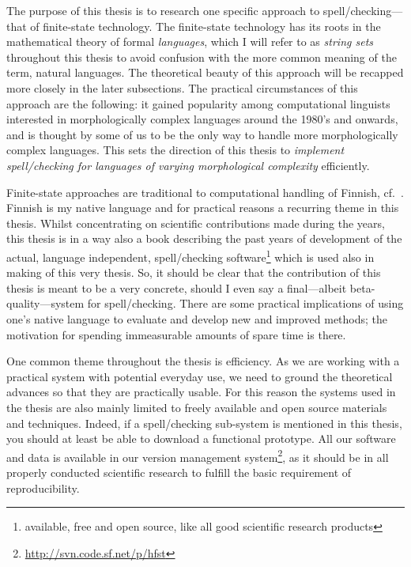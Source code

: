\documentclass[officiallayout]{unihelcompling}
\begin{document}
The purpose of this thesis is to research one specific approach to
spell\-/checking---that of finite-state technology. The finite-state technology
has its roots in the mathematical theory of formal \emph{languages}, which I
will refer to as \emph{string sets} throughout this thesis to avoid confusion
with the more common meaning of the term, natural languages. The theoretical
beauty of this approach will be recapped more closely in the later subsections.
The practical circumstances of this approach are the following: it gained
popularity among computational linguists interested in morphologically complex
languages around the 1980's and onwards, and is thought by some of us to be the
only way to handle more morphologically complex languages. This sets the
direction of this thesis to \emph{implement spell\-/checking for languages of
varying morphological complexity} efficiently.

Finite-state approaches are traditional to computational handling of Finnish,
cf.~\citet{koskenniemi1983twolevel}. Finnish is my native language and for
practical reasons a recurring theme in this thesis. Whilst concentrating on
scientific contributions made during the years, this thesis is in a way also a
book describing the past years of development of the actual, language
independent, spell\-/checking software\footnote{available, free and open source,
like all good scientific research products} which is used also in making of
this very thesis. So, it should be clear that the contribution of this thesis
is meant to be a very concrete, should I even say a final---albeit
beta-quality---system for spell\-/checking.  There are some practical
implications of using one's native language to evaluate and develop new and
improved methods; the motivation for spending immeasurable amounts of spare
time is there.

One common theme throughout the thesis is efficiency. As we are working with a
practical system with potential everyday use, we need to ground the theoretical
advances so that they are practically usable. For this reason the systems used
in the thesis are also mainly limited to freely available and open source
materials and techniques. Indeed, if a spell\-/checking sub-system is mentioned
in this thesis, you should at least be able to download a functional prototype.
All our software and data is available in our version management
system\footnote{\url{http://svn.code.sf.net/p/hfst}}, as it should be in all
properly conducted scientific research to fulfill the basic requirement of
reproducibility.
\end{document}
